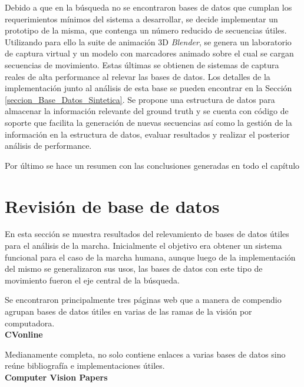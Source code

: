 Debido a que en la búsqueda no se encontraron bases de datos que cumplan los requerimientos mínimos del sistema a desarrollar, se decide implementar un prototipo de la misma, que contenga un número reducido de secuencias útiles. Utilizando para ello la suite de animación 3D \textit{Blender}, se genera un laboratorio de captura virtual y un modelo con marcadores animado sobre el cual se cargan secuencias de movimiento. Estas últimas se obtienen de sistemas de captura reales de alta performance al relevar las bases de datos. Los detalles de la implementación junto al análisis de esta base se pueden encontrar en la Sección \ref{seccion_Base_Datos_Sintetica}.  
Se propone una estructura de datos para almacenar la información relevante del ground truth y  se cuenta con código de soporte que facilita la generación de nuevas secuencias así como la gestión de la información en la estructura de datos, evaluar resultados y realizar el  posterior análisis de performance.

Por último se hace un resumen con las conclusiones generadas en todo el capítulo

\section{Revisión de base de datos}
\label{seccion_revision_base_datos}
En esta sección se muestra  resultados del relevamiento de bases de datos útiles para el análisis de la marcha.
Inicialmente el objetivo era obtener un sistema funcional para el caso de la marcha humana, aunque luego de la implementación del mismo se generalizaron sus usos, las bases de datos con este tipo de movimiento fueron el eje central de la búsqueda.

Se encontraron principalmente tres páginas web que a manera de compendio agrupan  bases de datos útiles en varias de las ramas de la visión por computadora.\\

\hspace{-0.7cm} \textbf{CVonline \cite{CVonline}} %

Medianamente completa, no solo contiene enlaces a  varias bases de datos sino reúne bibliografía e implementaciones útiles.\\


\hspace{-0.7cm} \textbf{Computer Vision Papers \cite{CVPapers}}  %

